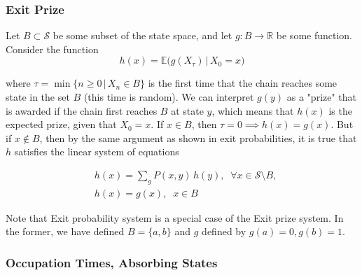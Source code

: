   \subsubsection{Exit Prize}

    Let $B \subset \mathcal{S}$ be some subset of the state space, and let $g: B \longrightarrow \mathbb{R}$ be some function. Consider the function 
    \begin{equation}
      h(x) = \mathbb{E}\big( g(X_\tau) \, |\, X_0 = x \big)
    \end{equation}

    where $\tau = \min\{ n\geq 0 \,|\, X_n \in B\}$ is the first time that the chain reaches some state in the set $B$ (this time is random). We can interpret $g(y)$ as a "prize" that is awarded if the chain first reaches $B$ at state $y$, which means that $h(x)$ is the expected prize, given that $X_0 = x$. If $x \in B$, then $\tau = 0 \implies h(x) = g(x)$. But if $x \not\in B$, then by the same argument as shown in exit probabilities, it is true that $h$ satisfies the linear system of equations

    \begin{align*}
      & h(x) = \sum_g P(x, y)\,h(y), \;\; \forall x \in \mathcal{S} \setminus B, \\
      & h(x) = g(x), \;\; x \in B 
    \end{align*}

    Note that Exit probability system is a special case of the Exit prize system. In the former, we have defined $B = \{a, b\}$ and $g$ defined by $g(a) = 0, g(b) = 1$. 

  \subsubsection{Occupation Times, Absorbing States}

